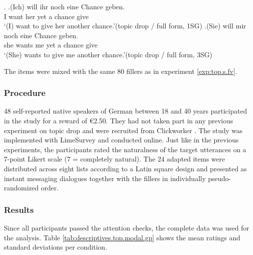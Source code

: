 \ex.\label{ex:td.top.modal.item}
\ag.\label{ex:td.top.modal.item.1sg}(Ich) will ihr noch eine Chance geben.\\
 I want her yet a chance give\\
`(I) want to give her another chance.'\hfill (topic drop / full form, 1SG)
\bg.\label{ex:td.top.modal.item.3sg}(Sie) will mir noch eine Chance geben.\\
she wants me yet a chance give\\
`(She) wants to give me another chance.'\hfill (topic drop / full form, 3SG)

The items were mixed with the same 80 fillers as in experiment \ref*{exp:top.s.fv}.

\subsubsection{Procedure}\label{sec:exp.top.s.mv.procedure}
48 self-reported native speakers of German between 18 and 40 years participated in the study for a reward of €2.50.
They had not taken part in any previous experiment on topic drop and were recruited from Clickworker \citep{clickworker2022}.
The study was implemented with LimeSurvey \citep{limesurveygmbh} and conducted online.
Just like in the previous experiments, the participants rated the naturalness of the target utterances on a 7-point Likert scale (7 = completely natural).
The 24 adapted items were distributed across eight lists according to a Latin square design and presented as instant messaging dialogues together with the fillers in individually pseudo-randomized order.

\subsubsection{Results}\label{sec:exp.top.s.mv.res}
Since all participants passed the attention checks, the complete data was used for the analysis.
Table \ref{tab:descriptives.top.modal.gp} shows the mean ratings and standard deviations per condition.

